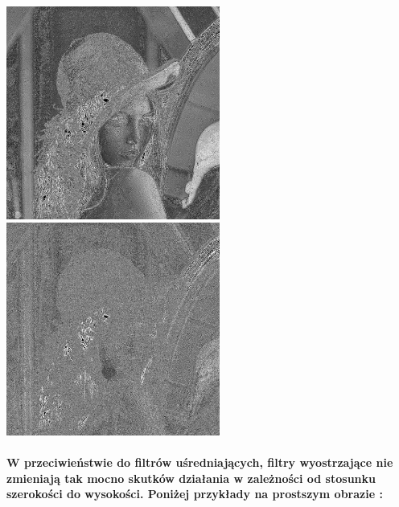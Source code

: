 \documentclass[a4paper,12pt,openany]{report}
\begin{document}
\begin{center}
\\
\\
\includegraphics[width=7cm]{resources/modified/lena/lena_sharpen_11x11.jpg}
\includegraphics[width=7cm]{resources/modified/lena/lena_sharpen_21x21.jpg}
\end{center}

\pagebreak
\paragraph{\indent W przeciwieństwie do filtrów uśredniających, filtry wyostrzające nie zmieniają tak mocno skutków działania w zależności od stosunku szerokości do wysokości. Poniżej przykłady na prostszym obrazie :}
\end{document}
